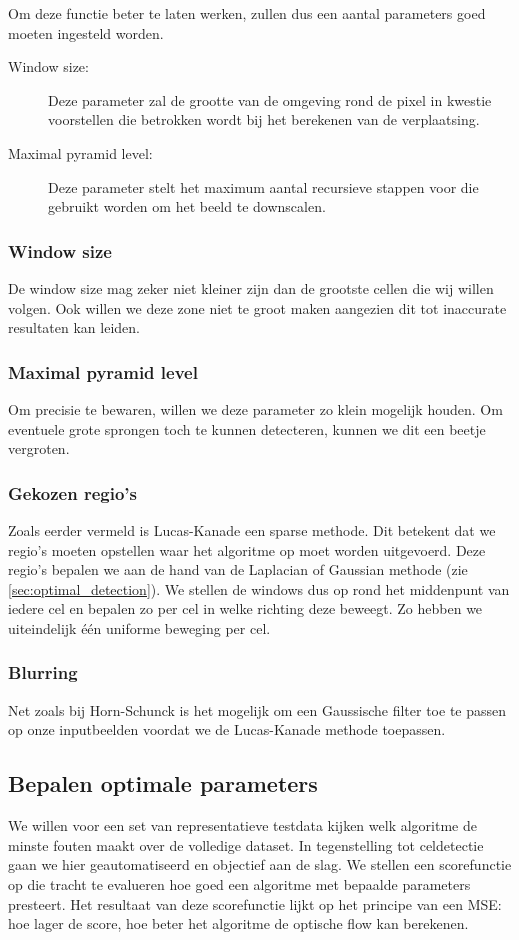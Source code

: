 \documentclass{article}
\begin{document}
\begin{multicols}{2}
Om deze functie beter te laten werken, zullen dus een aantal parameters goed moeten ingesteld worden.
\begin{description}
   \item[Window size:] Deze parameter zal de grootte van de omgeving rond de pixel in kwestie voorstellen die betrokken wordt bij het berekenen van de verplaatsing.
   \item[Maximal pyramid level:] Deze parameter stelt het maximum aantal recursieve stappen voor die gebruikt worden om het beeld te downscalen.
\end{description}
\subsubsection{Window size}
De window size mag zeker niet kleiner zijn dan de grootste cellen die wij willen volgen. Ook willen we deze zone niet te groot maken aangezien dit tot inaccurate resultaten kan leiden.
\subsubsection{Maximal pyramid level}
Om precisie te bewaren, willen we deze parameter zo klein mogelijk houden. Om eventuele grote sprongen toch te kunnen detecteren, kunnen we dit een beetje vergroten.
\subsubsection{Gekozen regio's}
Zoals eerder vermeld is Lucas-Kanade een sparse methode. Dit betekent dat we regio's moeten opstellen waar het algoritme op moet worden uitgevoerd. Deze regio's bepalen we aan de hand van de Laplacian of Gaussian methode (zie \autoref{sec:optimal_detection}). We stellen de windows dus op rond het middenpunt van iedere cel en bepalen zo per cel in welke richting deze beweegt. Zo hebben we uiteindelijk één uniforme beweging per cel.
\subsubsection{Blurring}
Net zoals bij Horn-Schunck is het mogelijk om een Gaussische filter toe te passen op onze inputbeelden voordat we de Lucas-Kanade methode toepassen.

\subsection{Bepalen optimale parameters}
We willen voor een set van representatieve testdata kijken welk algoritme de minste fouten maakt over de volledige dataset. In tegenstelling tot celdetectie gaan we hier geautomatiseerd en objectief aan de slag. We stellen een scorefunctie op die tracht te evalueren hoe goed een algoritme met bepaalde parameters presteert. Het resultaat van deze scorefunctie lijkt op het principe van een MSE: hoe lager de score, hoe beter het algoritme de optische flow kan berekenen.


\end{multicols}
\end{document}
